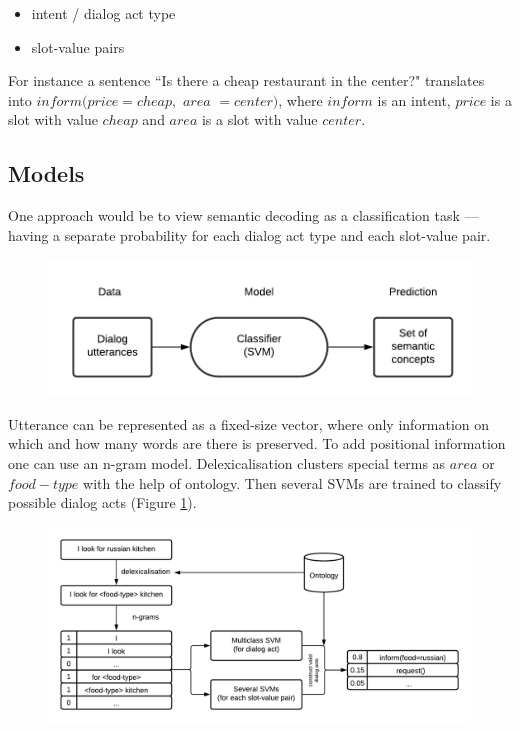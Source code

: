\documentclass[12pt,titlepage,a4paper]{article}
\begin{document}
\begin{itemize}
    \item intent / dialog act type
    \item slot-value pairs
\end{itemize}

For instance a sentence ``Is there a cheap restaurant in the center?" translates into $inform(price=cheap,$ $area$ $=center)$, where $inform$ is an intent, $price$ is a slot with value $cheap$ and $area$ is a slot with value $center$.

\subsection{Models}
One approach would be to view semantic decoding as a classification task --- having a sepa\-rate probabi\-lity for each dialog act type and each slot-value pair.

\begin{figure}[h!]
    \centering
    \includegraphics[width=0.8\linewidth]{training-2.png}
    \caption{}
\end{figure}

Utterance can be represented as a fixed-size vector, where only informa\-tion on which and how many words are there is preserved. To add positional information one can use an n-gram model. Delexicalisation clusters special terms as $area$ or $food-type$ with the help of ontology. Then several SVMs are trained to classify possible dialog acts (Figure \ref{fig:semantic-decoding-classification}).

\begin{figure}[h!]
    \includegraphics[width=0.998\textwidth]{semantic-decoding-classification.png}
    \caption{}
    \label{fig:semantic-decoding-classification}
\end{figure}
\end{document}
